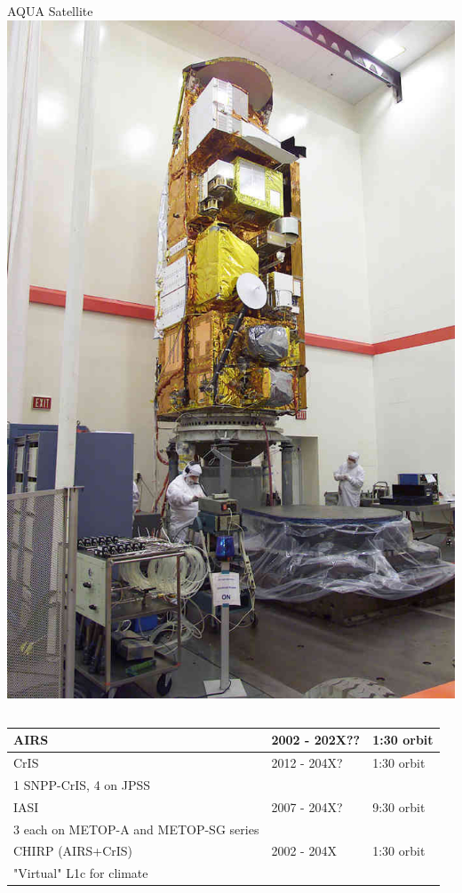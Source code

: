 \documentclass[10pt,t]{beamer}
\begin{document}
\begin{frame}
\begin{columns}[T]
\begin{column}{0.25\columnwidth}
  \vspace{-0.15in}
  \begin{block}{AQUA Satellite}
  \includegraphics[width=1.1\textwidth]{./aqua.jpg}
\end{block}
\end{column}
\end{columns}

\begin{footnotesize}
\begin{tabular}{lll}
AIRS & 2002 - 202X?? & 1:30 orbit\\
\hline
CrIS & 2012 - 204X? & 1:30 orbit\\
\small 1 SNPP-CrIS, 4 on JPSS &  & \\
\hline
IASI & 2007 - 204X? & 9:30 orbit\\
\small 3 each on METOP-A and METOP-SG series &  & \\
\hline
CHIRP (AIRS+CrIS) & 2002 - 204X & 1:30 orbit\\
"Virtual" L1c for climate &  & \\
\end{tabular}
\end{footnotesize}

\end{frame}
\end{document}
